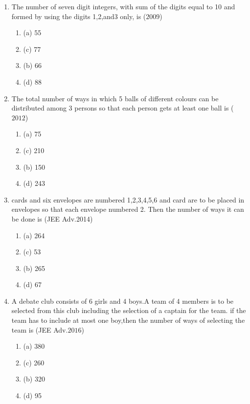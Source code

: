 \documentclass[journal,12pt,twocolumn]{IEEEtran}
\theoremstyle{remark}
\begin{document}
\begin{enumerate}[start=3]
\begin{multicols}{2}
\begin{enumerate}
\end{enumerate}
\end{multicols}
\item The number of seven digit integers, with sum of the digits equal to 10 and formed by using the digits 1,2,and3 only, is
\hfill{($2009$)}\\
\begin{multicols}{2} 
\begin{enumerate}
[label=, left=0pt, labelsep=0pt, itemsep=1em]
\item(a) 55\item(c) 77\item (b) 66\item(d) 88
\end{enumerate}
\end{multicols}
\item The total number of ways in which 5 balls of different colours can be distributed among 3 persons so that each person gets at least one ball is
\hfill{($2012$)}\\
\begin{multicols}{2} 
\begin{enumerate}
[label=, left=0pt, labelsep=0pt, itemsep=1em]
\item (a) 75\item (c) 210\item(b) 150\item (d) 243
\end{enumerate}
\end{multicols}
\item cards and six envelopes are numbered 1,2,3,4,5,6 and card are to be placed in envelopes so that each envelope numbered 2. Then the number of ways it can be done is
\hfill{(JEE Adv.2014)}\\
\begin{multicols}{2} 
\begin{enumerate}
[label=, left=0pt, labelsep=0pt, itemsep=1em]
\item (a) 264\item (c) 53\item(b) 265\item  (d) 67
\end{enumerate}
\end{multicols}
\item A debate club consists of 6 girls and 4 boys.A team of 4 members is to be selected from this club including the selection of a captain for the team. if the team has to include at most one boy,then the number of ways of selecting the team is
\hfill{(JEE Adv.$2016$)}\\
\begin{multicols}{2} 
\begin{enumerate}
[label=, left=0pt, labelsep=0pt, itemsep=1em]
\item (a) 380\item (c) 260\item(b) 320\item (d) 95
\end{enumerate}
\end{multicols}

\end{enumerate}
\end{document}
